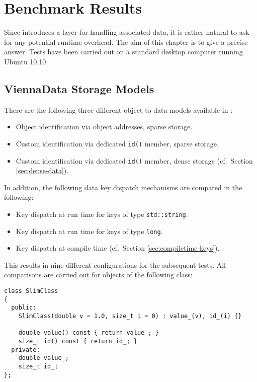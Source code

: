 \chapter{Benchmark Results} \label{chap:benchmarks}



Since {\ViennaData} introduces a layer for handling associated data, it is rather
natural to ask for any potential runtime overhead. The aim of this
chapter is to give a precise answer. Tests have been carried out on a standard desktop computer running Ubuntu 10.10.

\section{ViennaData Storage Models}
There are the following three different object-to-data models available in {\ViennaData}:
\begin{itemize}
 \item Object identification via object addresses, sparse storage.
 \item Custom identification via dedicated \lstinline|id()| member, sparse storage.
 \item Custom identification via dedicated \lstinline|id()| member, dense storage (cf.~Section \ref{sec:dense-data}).
\end{itemize}
In addition, the following data key dispatch mechanisms are compared in the following:
\begin{itemize}
 \item Key dispatch at run time for keys of type \lstinline|std::string|.
 \item Key dispatch at run time for keys of type \lstinline|long|.
 \item Key dispatch at compile time (cf.~Section \ref{sec:compiletime-keys}).
\end{itemize}
This results in nine different configurations for the subsequent tests. All comparisons are carried out for objects of the following class:
\begin{lstlisting}
class SlimClass
{
  public:
    SlimClass(double v = 1.0, size_t i = 0) : value_(v), id_(i) {}

    double value() const { return value_; }
    size_t id() const { return id_; }
  private:
    double value_;
    size_t id_;
};
\end{lstlisting}

